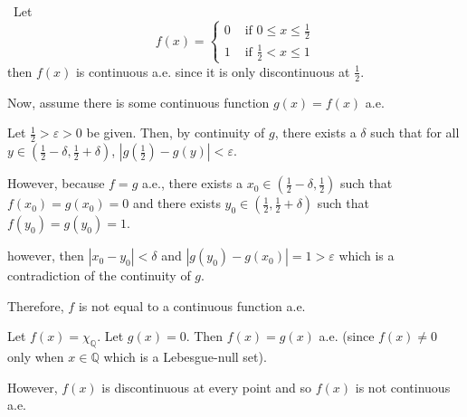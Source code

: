 \documentclass[12pt]{Qual}
\begin{document}
\begin{solution}$\,$
 Let \[
f(x)=\begin{cases}
0 & \text{ if }0\le x\le\frac{1}{2}\\
1 & \text{ if }\frac{1}{2}<x\le 1
\end{cases}
\]
 then $f(x)$ is continuous a.e. since it is only discontinuous at $\frac{1}{2}$.

 Now, assume there is some continuous function $g(x)=f(x)$ a.e.

 Let $\frac{1}{2}>\varepsilon>0$ be given. Then, by continuity of $g$, there exists a $\delta$ such that for all $y\in(\frac{1}{2}-\delta,\frac{1}{2}+\delta)$, $|g(\frac{1}{2})-g(y)|<\varepsilon$.

 However, because $f=g$ a.e., there exists a $x_0\in (\frac{1}{2}-\delta,\frac{1}{2})$ such that $f(x_0)=g(x_0)=0$ and there exists $y_0\in(\frac{1}{2},\frac{1}{2}+\delta)$ such that $f(y_0)=g(y_0)=1$.

 however, then $|x_0-y_0|<\delta$ and $|g(y_0)-g(x_0)|=1>\varepsilon$ which is a contradiction of the continuity of $g$. \contradiction

 Therefore, $f$ is not equal to a continuous function a.e.

 Let $f(x)=\chi_\mathbb{Q}$. Let $g(x)=0$. Then $f(x)=g(x)$ a.e. (since $f(x)\not=0$ only when $x\in\mathbb{Q}$ which is a Lebesgue-null set).

However, $f(x)$ is discontinuous at every point and so $f(x)$ is not continuous a.e.
\end{solution}
\vspace{0.5cm}
\end{document}
